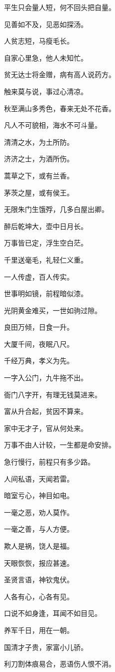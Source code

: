 \documentclass[12pt,oneside]{book}
\begin{document}
平生只会量人短，何不回头把自量。

见善如不及，见恶如探汤。

人贫志短，马瘦毛长。

自家心里急，他人未知忙。

贫无达士将金赠，病有高人说药方。

触来莫与说，事过心清凉。

秋至满山多秀色，春来无处不花香。

凡人不可貌相，海水不可斗量。

清清之水，为土所防。

济济之士，为酒所伤。

蒿草之下，或有兰香。

茅茨之屋，或有侯王。

无限朱门生饿殍，几多白屋出卿。

醉后乾坤大，壶中日月长。

万事皆已定，浮生空白茫。

千里送毫毛，礼轻仁义重。

一人传虚，百人传实。

世事明如镜，前程暗似漆。

光阴黄金难买，一世如驹过隙。

良田万倾，日食一升。

大厦千间，夜眠八尺。

千经万典，孝义为先。

一字入公门，九牛拖不出。

衙门八字开，有理无钱莫进来。

富从升合起，贫因不算来。

家中无才子，官从何处来。

万事不由人计较，一生都是命安排。

急行慢行，前程只有多少路。

人间私语，天闻若雷。

暗室亏心，神目如电。

一毫之恶，劝人莫作。

一毫之善，与人方便。

欺人是祸，饶人是福。

天眼恢恢，报应甚速。

圣贤言语，神钦鬼伏。

人各有心，心各有见。

口说不如身逢，耳闻不如目见。

养军千日，用在一朝。

国清才子贵，家富小儿骄。

利刀割体痕易合，恶语伤人恨不消。
\end{document}
